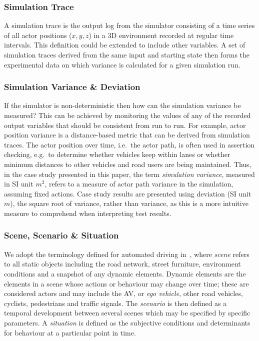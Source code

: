 \subsubsection{Simulation Trace}
A simulation trace is the output log from the simulator consisting of a time series of all actor positions ($x,y,z$) in a 3D environment recorded at regular time intervals. This definition could be extended to include other variables. A set of simulation traces derived from the same input and starting state then forms the experimental data on which variance is calculated for a given simulation run. \\

\subsubsection{Simulation Variance \& Deviation}
If the simulator is non-deterministic then how can the simulation variance be measured? This can be achieved by monitoring the values of any of the recorded output variables that should be consistent from run to run. For example, actor position variance is a distance-based metric that can be derived from simulation traces. The actor position over time, i.e.\ the actor path, is often used in assertion checking, e.g.\ to determine whether vehicles keep within lanes or whether minimum distances to other vehicles and road users are being maintained. 
% 
Thus, in the case study presented in this paper, the term \textit{simulation variance}, measured in SI unit $m^2$, refers to a measure of actor path variance in the simulation, assuming fixed actions. Case study results are presented using deviation (SI unit $m$), the square root of variance, rather than variance, as this is a more intuitive measure to comprehend when interpreting test results.
\\

\subsubsection{Scene, Scenario \& Situation}
We adopt the terminology defined for automated driving in~\cite{Ulbrich2015}, where \textit{scene} refers to all static objects including the road network, street furniture, environment conditions and a snapshot of any dynamic elements. Dynamic elements are the elements in a scene whose actions or behaviour may change over time; these are considered actors and may include the AV, or \textit{ego vehicle}, other road vehicles, cyclists, pedestrians and traffic signals. The \textit{scenario} is then defined as a temporal development between several scenes which may be specified by specific parameters. A \textit{situation} is defined as the subjective conditions and determinants for behaviour at a particular point in time.



